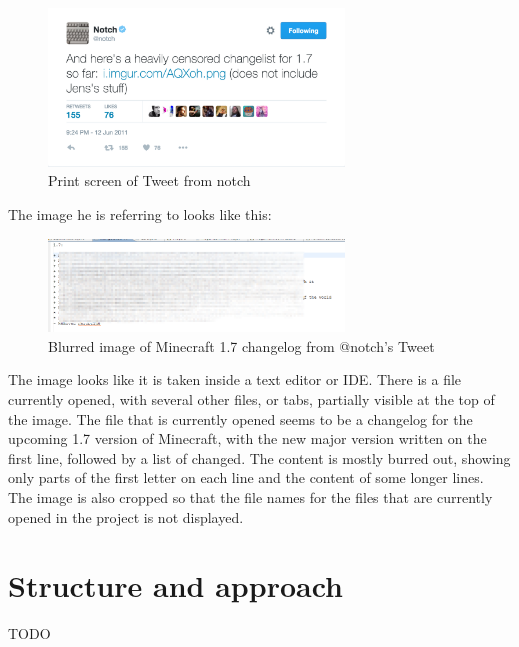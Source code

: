 \begin{figure}[h]
    \centering
    \includegraphics[width=0.7\textwidth]{fig/chapter1/notch_tweet.png}
    \caption{Print screen of Tweet from notch\protect\footnotemark}
\end{figure}

The image he is referring to looks like this:

\begin{figure}[h]
    \centering
    \includegraphics[width=0.7\textwidth]{fig/chapter1/notch_eclipse.png}
    \caption{Blurred image of Minecraft 1.7 changelog from @notch's Tweet}
\end{figure}

The image looks like it is taken inside a text editor or \gls{IDE}. There is a file currently opened, with several other files, or tabs, partially visible at the top of the image. The file that is currently opened seems to be a changelog for the upcoming 1.7 version of Minecraft, with the new major version written on the first line, followed by a list of changed. The content is mostly burred out, showing only parts of the first letter on each line and the content of some longer lines. The image is also cropped so that the file names for the files that are currently opened in the project is not displayed.

\section{Structure and approach}
TODO